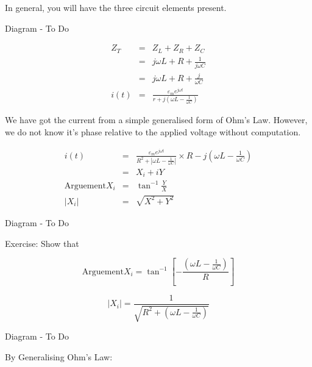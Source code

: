 \documentclass[a4paper,12pt]{article}
\begin{document}
In general, you will have the three circuit elements present.

\begin{table}[hbtp]

Diagram - To Do

\end{table}

\begin{eqnarray*}
Z_{T} & = & Z_{L} + Z_{R} + Z_{C} \\
		& = & j \omega L + R + \frac{1}{j \omega C} \\
		& = & j \omega L + R + \frac{j}{\omega C} \\
i(t)	& = & \frac{\varepsilon_{m} e^{j \omega t}}{r + j\left(\omega L -
\frac{1}{\omega C} \right)}
\end{eqnarray*}

We have got the current from a simple generalised form of Ohm's Law.
However, we do not know it's phase relative to the applied voltage
without computation.

\begin{eqnarray*}
i(t) & = & \frac{\varepsilon_{m} e^{j \omega t}}{R^{2} + \left| \omega L
- \frac{1}{\omega C} \right|} \times R - j \left(\omega L -
\frac{1}{\omega C} \right) \\
	  & = & X_{i} + i Y \\
\mbox{Arguement} X_{i} & = & \tan^{-1}{\frac{Y}{X}} \\
\left| X_{i} \right| & = & \sqrt{X^{2} + Y^{2}}
\end{eqnarray*}

\begin{table}[hbtp]

Diagram - To Do

\end{table}

Exercise: Show that

\[ \mbox{Arguement} X_{i} = \tan^{-1}{\left[ - \frac{\left( \omega L -
\frac{1}{\omega C} \right)}{R} \right]} \]

\[ \left| X_{i} \right| = \frac{1}{\sqrt{R^{2} + \left( \omega L -
\frac{1}{\omega C} \right)}} \]


\begin{table}[hbtp]

Diagram - To Do

\end{table}

By Generalising Ohm's Law:
\end{document}
